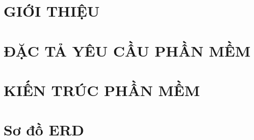 \documentclass[a4paper,12pt]{report}
\begin{document}


\tableofcontents
\newpage



\newpage

\chapter{GIỚI THIỆU}



\chapter{ĐẶC TẢ YÊU CẦU PHẦN MỀM}


\chapter{KIẾN TRÚC PHẦN MỀM}



\chapter{Sơ đồ ERD}

\end{document}
